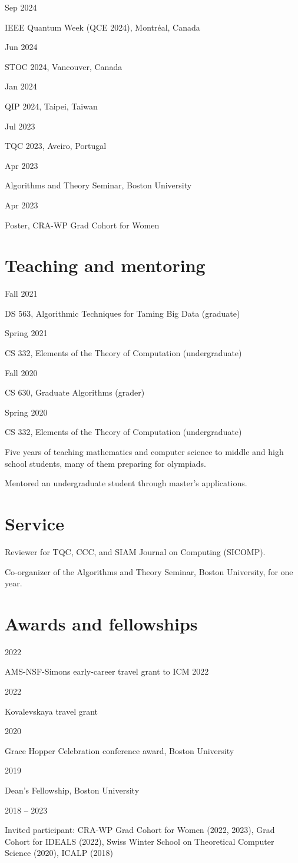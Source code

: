 \documentclass[10pt]{article}
\newif\ifdraft
\newcommand{\todo}[1]{\ifdraft\textcolor{todo}{[TODO: #1]}\fi}
\newcommand{\subhead}[1]{\par\vspace{5pt}{\bfseries #1}\par\vspace{2pt}}
\newlength{\datecol}
\newlength{\entrygap}
\newcommand{\entry}[2]{%
  \par\noindent
  \parbox[t]{\datecol}{\raggedright\strut\textcolor{muted}{#1}}%
  \hspace{\entrygap}%
  \parbox[t]{\dimexpr\linewidth-\datecol-\entrygap\relax}{\raggedright\strut #2\strut}%
  \par\vspace{2pt}}
\begin{document}
\subhead{Conference talks}
\entry{Sep 2024}{IEEE Quantum Week (QCE 2024), Montréal, Canada}
\entry{Jun 2024}{STOC 2024, Vancouver, Canada}
\entry{Jan 2024}{QIP 2024, Taipei, Taiwan}
\entry{Jul 2023}{TQC 2023, Aveiro, Portugal}

\subhead{Other talks and posters}
\entry{Apr 2023}{Algorithms and Theory Seminar, Boston University}
\entry{Apr 2023}{Poster, CRA-WP Grad Cohort for Women}

\section{Teaching and mentoring}
\subhead{Teaching fellow, Boston University}
\entry{Fall 2021}{DS 563, Algorithmic Techniques for Taming Big Data (graduate)}
\entry{Spring 2021}{CS 332, Elements of the Theory of Computation (undergraduate)}
\entry{Fall 2020}{CS 630, Graduate Algorithms (grader)}
\entry{Spring 2020}{CS 332, Elements of the Theory of Computation (undergraduate)}

\subhead{Other teaching and mentoring}
\entry{\todo{years}}{Five years of teaching mathematics and computer science to middle and high school students, many of them preparing for olympiads.}
\entry{}{Mentored an undergraduate student through master's applications.}

\section{Service}
\entry{}{Reviewer for TQC, CCC, and SIAM Journal on Computing (SICOMP).}
\entry{}{Co-organizer of the Algorithms and Theory Seminar, Boston University, for one year.}

\section{Awards and fellowships}
\entry{2022}{AMS-NSF-Simons early-career travel grant to ICM 2022}
\entry{2022}{Kovalevskaya travel grant}
\entry{2020}{Grace Hopper Celebration conference award, Boston University}
\entry{2019}{Dean's Fellowship, Boston University}
\entry{2018 -- 2023}{Invited participant: CRA-WP Grad Cohort for Women (2022, 2023), Grad Cohort for IDEALS (2022),
  Swiss Winter School on Theoretical Computer Science (2020), ICALP (2018)}
\end{document}
